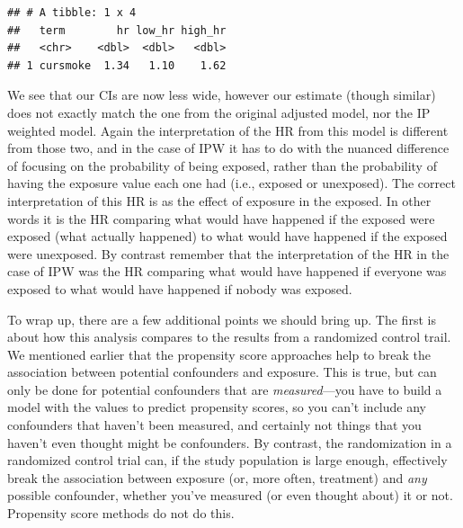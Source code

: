 \documentclass[
]{book}
\begin{document}
\begin{verbatim}
## # A tibble: 1 x 4
##   term        hr low_hr high_hr
##   <chr>    <dbl>  <dbl>   <dbl>
## 1 cursmoke  1.34   1.10    1.62
\end{verbatim}

We see that our CIs are now less wide, however our estimate (though similar) does not exactly match the one from the original adjusted model, nor the IP weighted model. Again the interpretation of the HR from this model is different from those two, and in the case of IPW it has to do with the nuanced difference of focusing on the probability of being exposed, rather than the probability of having the exposure value each one had (i.e., exposed or unexposed). The correct interpretation of this HR is as the effect of exposure in the exposed. In other words it is the HR comparing what would have happened if the exposed were exposed (what actually happened) to what would have happened if the exposed were unexposed. By contrast remember that the interpretation of the HR in the case of IPW was the HR comparing what would have happened if everyone was exposed to what would have happened if nobody was exposed.

To wrap up, there are a few additional points we should bring up. The first is about how this analysis compares to the results from a randomized control trail. We mentioned earlier that the propensity score approaches help to break the association between potential confounders and exposure. This is true, but can only be done for potential confounders that are \emph{measured}---you have to build a model with the values to predict propensity scores, so you can't include any confounders that haven't been measured, and certainly not things that you haven't even thought might be confounders. By contrast, the randomization in a randomized control trial can, if the study population is large enough, effectively break the association between exposure (or, more often, treatment) and \emph{any} possible confounder, whether you've measured (or even thought about) it or not. Propensity score methods do not do this.
\end{document}
